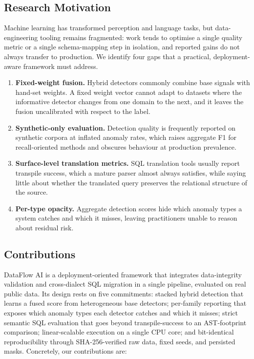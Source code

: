 \documentclass{ieeeaccess}
\begin{document}
\subsection{Research Motivation}

Machine learning has transformed perception and language tasks, but
data-engineering tooling remains fragmented: work tends to optimise a single
quality metric or a single schema-mapping step in isolation, and reported gains
do not always transfer to production. We identify four gaps that a practical,
deployment-aware framework must address.

\begin{enumerate}
\item \textbf{Fixed-weight fusion.} Hybrid detectors commonly combine base
  signals with hand-set weights. A fixed weight vector cannot adapt to datasets
  where the informative detector changes from one domain to the next, and it
  leaves the fusion uncalibrated with respect to the label.
\item \textbf{Synthetic-only evaluation.} Detection quality is frequently
  reported on synthetic corpora at inflated anomaly rates, which raises
  aggregate F1 for recall-oriented methods and obscures behaviour at production
  prevalence.
\item \textbf{Surface-level translation metrics.} SQL translation tools usually
  report transpile success, which a mature parser almost always satisfies, while
  saying little about whether the translated query preserves the relational
  structure of the source.
\item \textbf{Per-type opacity.} Aggregate detection scores hide which anomaly
  types a system catches and which it misses, leaving practitioners unable to
  reason about residual risk.
\end{enumerate}

\subsection{Contributions}

DataFlow AI is a deployment-oriented framework that integrates data-integrity
validation and cross-dialect SQL migration in a single pipeline, evaluated on
real public data. Its design rests on five commitments: stacked hybrid detection
that learns a fused score from heterogeneous base detectors; per-family
reporting that exposes which anomaly types each detector catches and which it
misses; strict semantic SQL evaluation that goes beyond transpile-success to an
AST-footprint comparison; linear-scalable execution on a single CPU core; and
bit-identical reproducibility through SHA-256-verified raw data, fixed seeds, and
persisted masks. Concretely, our contributions are:
\end{document}
